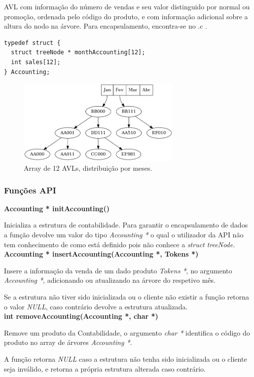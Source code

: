 \documentclass[10pt] {article}
\begin{document}
\par AVL com informação do número de vendas e seu valor distinguido por normal ou promoção, ordenada pelo código do produto, e com informação adicional sobre a altura do nodo na árvore. Para encapsulamento, encontra-se no .c .

\begin{lstlisting}
typedef struct {
  struct treeNode * monthAccounting[12];
  int sales[12];
} Accounting;
\end{lstlisting}
\begin{figure}[ht!]
\centering
\includegraphics[width=80mm]{accounting.png}
\caption{Array de 12 AVLs, distribuição por meses.}
\end{figure}

\subsubsection{Funções API}
\noindent \textbf {Accounting * initAccounting()}
\par Inicializa a estrutura de contabilidade.  Para garantir o encapsulamento de dados a função devolve um valor do tipo \emph{Accounting *} o qual o utilizador da API
não tem conhecimento de como está definido pois não conhece a \emph{struct treeNode.} \\

\noindent \textbf {Accounting * insertAccounting(Accounting *, Tokens *)}
\par Insere a informação da venda de um dado produto \emph{Tokens *}, no argumento \emph{Accounting *}, adicionando ou atualizando na árvore do respetivo mês.
\par Se a estrutura não tiver sido inicializada ou o cliente não existir a função retorna o valor \emph{NULL},
caso contrário devolve a estrutura atualizada. \\

\noindent \textbf {int removeAccounting(Accounting *, char *)}
\par Remove um produto da Contabilidade, o argumento \emph{char *} identifica o código do produto no array de árvores \emph{Accounting *}.
\par A função retorna \emph{NULL} caso a estrutura não tenha sido inicializada ou o cliente seja inválido, e retorna a própria estrutura alterada caso contrário. \\
\end{document}
